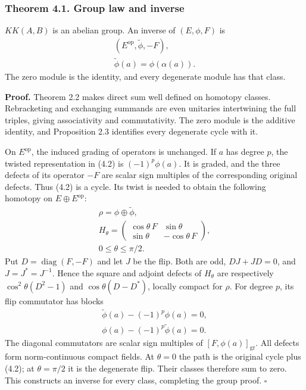 \documentclass[
  11pt,
]{article}
\begin{document}
\subsubsection{Theorem 4.1. Group law and
inverse}\label{theorem-4.1.-group-law-and-inverse}

\(KK(A,B)\) is an abelian group. An inverse of \((E,\phi,F)\) is \[
\begin{gathered}
(E^{\mathrm{op}},\widetilde\phi,-F),\\
\widetilde\phi(a)=\phi(\alpha(a)).
\end{gathered}
\tag{4.2}
\] The zero module is the identity, and every degenerate module has that
class.

\textbf{Proof.} Theorem 2.2 makes direct sum well defined on homotopy
classes. Rebracketing and exchanging summands are even unitaries
intertwining the full triples, giving associativity and commutativity.
The zero module is the additive identity, and Proposition 2.3 identifies
every degenerate cycle with it.

On \(E^{\mathrm{op}}\), the induced grading of operators is unchanged.
If \(a\) has degree \(p\), the twisted representation in (4.2) is
\((-1)^p\phi(a)\). It is graded, and the three defects of its operator
\(-F\) are scalar sign multiples of the corresponding original defects.
Thus (4.2) is a cycle. Its twist is needed to obtain the following
homotopy on \(E\oplus E^{\mathrm{op}}\): \[
\begin{gathered}
\rho=\phi\oplus\widetilde\phi,\\
H_\theta=
\begin{pmatrix}
\cos\theta\,F&\sin\theta\\
\sin\theta&-\cos\theta\,F
\end{pmatrix},
\\
0\leq\theta\leq\pi/2.
\end{gathered}
\tag{4.3}
\] Put \(D=\operatorname{diag}(F,-F)\) and let \(J\) be the flip. Both
are odd, \(DJ+JD=0\), and \(J=J^*=J^{-1}\). Hence the square and adjoint
defects of \(H_\theta\) are respectively \(\cos^2\theta(D^2-1)\) and
\(\cos\theta(D-D^*)\), locally compact for \(\rho\). For degree \(p\),
its flip commutator has blocks \[
\begin{gathered}
\widetilde\phi(a)-(-1)^p\phi(a)=0,
\\
 \phi(a)-(-1)^p\widetilde\phi(a)=0.
\end{gathered}
\] The diagonal commutators are scalar sign multiples of
\([F,\phi(a)]_{\mathrm{gr}}\). All defects form norm-continuous compact
fields. At \(\theta=0\) the path is the original cycle plus (4.2); at
\(\theta=\pi/2\) it is the degenerate flip. Their classes therefore sum
to zero. This constructs an inverse for every class, completing the
group proof. \(\square\)
\end{document}
